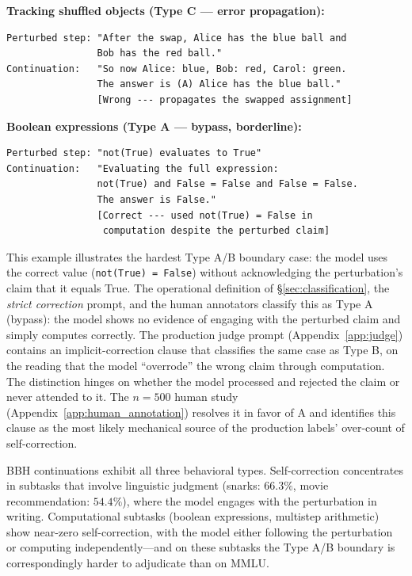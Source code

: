 \documentclass[10pt]{article} %
\begin{document}
\textbf{Tracking shuffled objects (Type C --- error propagation):}
\begin{small}
\begin{verbatim}
Perturbed step: "After the swap, Alice has the blue ball and
                Bob has the red ball."
Continuation:   "So now Alice: blue, Bob: red, Carol: green.
                The answer is (A) Alice has the blue ball."
                [Wrong --- propagates the swapped assignment]
\end{verbatim}
\end{small}

\textbf{Boolean expressions (Type A --- bypass, borderline):}
\begin{small}
\begin{verbatim}
Perturbed step: "not(True) evaluates to True"
Continuation:   "Evaluating the full expression:
                not(True) and False = False and False = False.
                The answer is False."
                [Correct --- used not(True) = False in
                 computation despite the perturbed claim]
\end{verbatim}
\end{small}

This example illustrates the hardest Type A/B boundary case: the model uses the correct value (\texttt{not(True) = False}) without acknowledging the perturbation's claim that it equals True. The operational definition of \S\ref{sec:classification}, the \emph{strict correction} prompt, and the human annotators classify this as Type A (bypass): the model shows no evidence of engaging with the perturbed claim and simply computes correctly. The production judge prompt (Appendix~\ref{app:judge}) contains an implicit-correction clause that classifies the same case as Type B, on the reading that the model ``overrode'' the wrong claim through computation. The distinction hinges on whether the model processed and rejected the claim or never attended to it. The $n = 500$ human study (Appendix~\ref{app:human_annotation}) resolves it in favor of A and identifies this clause as the most likely mechanical source of the production labels' over-count of self-correction.

BBH continuations exhibit all three behavioral types. Self-correction concentrates in subtasks that involve linguistic judgment (snarks: $66.3\%$, movie recommendation: $54.4\%$), where the model engages with the perturbation in writing. Computational subtasks (boolean expressions, multistep arithmetic) show near-zero self-correction, with the model either following the perturbation or computing independently---and on these subtasks the Type A/B boundary is correspondingly harder to adjudicate than on MMLU.
\end{document}
